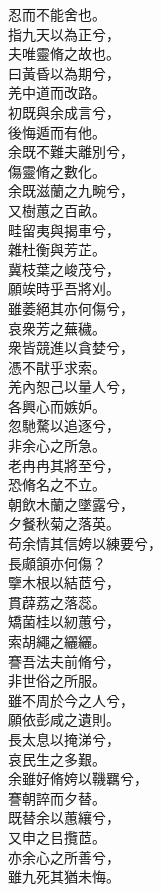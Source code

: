 \begin{pinyinscope}
\begin{shici}
忍而不能舍也。\\
指九天以為正兮，\\
夫唯靈脩之故也。\\
曰黃昏以為期兮，\\
羌中道而改路。\\
初既與余成言兮，\\
後悔遁而有他。\\
余既不難夫離別兮，\\
傷靈脩之數化。\\
余既滋蘭之九畹兮，\\
又樹蕙之百畝。\\
畦留夷與揭車兮，\\
雜杜衡與芳芷。\\
冀枝葉之峻茂兮，\\
願竢時乎吾將刈。\\
雖萎絕其亦何傷兮，\\
哀衆芳之蕪穢。\\
衆皆競進以貪婪兮，\\
憑不猒乎求索。\\
羌內恕己以量人兮，\\
各興心而嫉妒。\\
忽馳騖以追逐兮，\\
非余心之所急。\\
老冉冉其將至兮，\\
恐脩名之不立。\\
朝飲木蘭之墜露兮，\\
夕餐秋菊之落英。\\
苟余情其信姱以練要兮，\\
長顑頷亦何傷？\\
擥木根以結茝兮，\\
貫薜荔之落蕊。\\
矯菌桂以紉蕙兮，\\
索胡繩之纚纚。\\
謇吾法夫前脩兮，\\
非世俗之所服。\\
雖不周於今之人兮，\\
願依彭咸之遺則。\\
長太息以掩涕兮，\\
哀民生之多艱。\\
余雖好脩姱以鞿羈兮，\\
謇朝誶而夕替。\\
既替余以蕙纕兮，\\
又申之㠯攬茝。\\
亦余心之所善兮，\\
雖九死其猶未悔。\\

\end{shici}
\end{pinyinscope}
